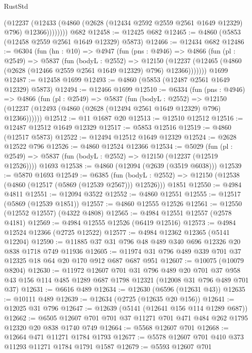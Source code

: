 \begin{lexlean}{RustStd}
\begin{coremodule}
              (@12237
                (@12433 (@4860 (@2628 (@12434 @2592 @2559 @2561 @1649 @12329) @796) @12366))))))))
    @682
@12458 := @12425 @682
@12465 := @4860 (@5853 (@12458 @2559 @2561 @1649 @12329) @5873)
@12466 := @12434 @682
@12486 := @6304
    (fun (hn : @10) =>
    @4947
      (fun (pns : @4946) =>
      @4866
        (fun (pl : @2549) =>
        @5837
          (fun (bodyL : @2552) =>
          @12150 (@12237 (@12465 (@4860 (@2628 (@12466 @2559 @2561 @1649 @12329) @796) @12366)))))))
    @1699
@12487 := @12458 @1699
@12493 := @4860 (@5853 (@12487 @2561 @1649 @12329) @5873)
@12494 := @12466 @1699
@12510 := @6334
    (fun (pns : @4946) =>
    @4866
      (fun (pl : @2549) =>
      @5837
        (fun (bodyL : @2552) =>
        @12150 (@12237 (@12493 (@4860 (@2628 (@12494 @2561 @1649 @12329) @796) @12366))))))
@12512 := @11 @1687 @20
@12513 := @12510 @12512
@12516 := @12487 @12512 @1649 @12329
@12517 := @5853 @12516
@12519 := @4860 (@12517 @5873)
@12522 := @12494 @12512 @1649 @12329
@12524 := @2628 @12522 @796
@12526 := @4860 @12524 @12366
@12534 := @5029
    (fun (pl : @2549) => @5837 (fun (bodyL : @2552) => @12150 (@12237 (@12519 @12526))))
    @1693
@12538 := @4860 (@12094 (@2639 (@3519 @6038)))
@12539 := @5870 @1693
@12549 := @6385
    (fun (bodyL : @2552) => @12150 (@12538 (@4860 (@12517 (@5869 (@12539 @2567))) @12526)))
    @1851
@12550 := @4984 @4811
@12551 := @12094 @3522
@12552 := @4860 @12551
@12555 := @12517 (@5869 (@12539 @1851))
@12557 := @4860 @12555 @12526
@12561 := @12550 (@12552 @12557) (@4322 @4808)
@12565 := @4984 @12551 @12557 (@2578 @4181)
@12569 := @4984 @12555 @12526 (@6419 @12516)
@12573 := @4984 @12524 @12366 (@2725 @12522)
@12577 := @4984 @12362 @12365 (@5141 @12204)
@12590 := @11885 @37 @31 @796 @48 @489 @340 @696 @12326 @20 @838 @1718 @749 @11936
@12605 := @11974 @31 @796 @489 @339 @701 @37 @12325 @18 @64 @20 @170 @912 @687 @687 @951
@12607 := @10075 (@10079 @8204)
@12630 := @11972
    @12607
    @701
    @31
    @796
    @489
    @20
    @701
    @37
    @958
    @43
    @156
    @114
    @485
    @1289
    @687
    @1798
    @12321
    (@12008 @31 @796 @489 @701 @37)
@12631 := @6616 @489
@12634 := @12630 (@6596 (@12631 @43))
@12635 := @10111 @489
@12639 := @12634 (@2725 (@12635 @20 @156))
@12641 := @12025 @31 @796
@12647 := @12639 (@5141 (@12641 @156 @114 @1289 @687))
@12662 := @6505 @12607 @701 @701 @37 @11271 @701 @471 @484 @262 @1795 @12320 @20 @838 @1740 @749
@12664 := @5568 @12607 @701
@12668 := @12664 @471 @11271 @1784 @1793
@12677 := @5578 @12607 @701 @410 @373 @11293 @11271 @1784 @1791 @1587
@12679 := @5593 @12607 @701

\end{coremodule}
\end{lexlean}

